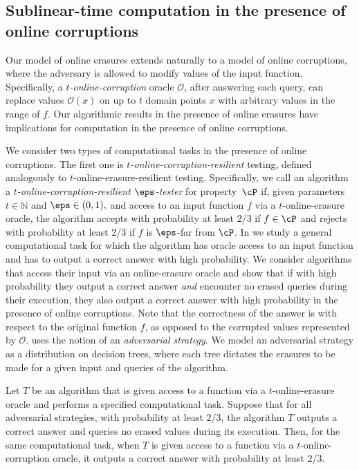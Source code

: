 \documentclass{toc}
\begin{document}
%
\subsection{Sublinear-time computation in the presence of online corruptions}

Our model of online erasures extends naturally to a model of online corruptions, where the adversary is allowed to modify values of the input function. Specifically, a \emph{$t$-online-corruption} oracle $\mathcal{O}$, after answering each query, can replace values $\mathcal{O}(x)$ on up to $t$ domain points $x$ with arbitrary values in the range of $f$. Our algorithmic results in the presence of online erasures have implications for computation in the presence of online corruptions. 

We consider two types of computational tasks in the presence of online corruptions. The first one is {\em $t$-online-corruption-resilient} testing, defined analogously to $t$-online-erasure-resilient testing. Specifically, we call an algorithm a {\em $t$-online-corruption-resilient $\eps$-tester} for property~$\cP$ if, given parameters $t\in\mathbb{N}$ and $\eps\in(0,1),$ and access to an input function $f$ via a $t$-online-erasure oracle, the algorithm accepts with probability at least 2/3 if $f\in\cP$ and rejects with probability at least 2/3 if $f$ is $\eps$-far from $\cP$.
In  we study a general computational task for which the algorithm has oracle access to an input function and has to output a correct answer with high probability. We consider algorithms that access their input via an online-erasure oracle and show that if with high probability they output a correct answer \emph{and} encounter no erased queries during their execution, they also output a correct answer with high probability in the presence of online corruptions. Note that the correctness of the answer is with respect to the original function $f$, as opposed to the corrupted values represented by $\mathcal{O}$.
%
%
%
%
%
%
%
%
  uses the notion of an \emph{adversarial strategy}.
We model an adversarial strategy as a distribution on decision trees, where each tree dictates the erasures to be made for a given input and queries of the algorithm.

%
%
%
%


\begin{lemma}\label{lem:no_erasures}
    Let $T$ be an algorithm that is given access to a function via a $t$-online-erasure oracle and performs a specified computational task. Suppose that for all adversarial strategies, with probability at least $2/3$, the algorithm $T$ outputs a correct answer and queries no erased values during its execution. Then, for the same computational task, when $T$ is given access to a function via a $t$-online-corruption oracle, it outputs a correct answer with probability at least $2/3$. 
\end{lemma}
\end{document}
